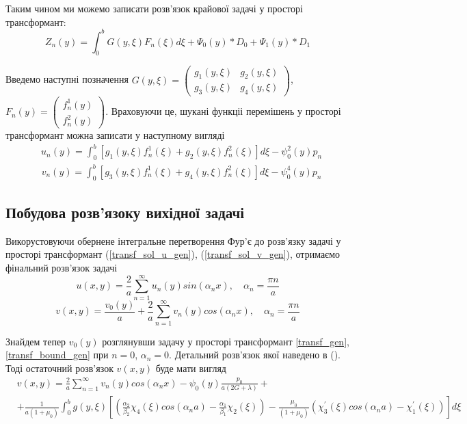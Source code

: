 Таким чином ми можемо записати розв'язок крайової задачі у просторі трансформант:
\begin{equation}
    Z_n(y) = \int_0^b G(y,\xi) F_n(\xi) d\xi + \Psi_0(y) * D_0 + \Psi_1(y) * D_1
\end{equation}

Введемо наступні позначення $G(y, \xi) = \begin{pmatrix}
    g_1(y,\xi) & g_2(y,\xi) \\
    g_3(y,\xi) & g_4(y,\xi)
\end{pmatrix}$, $F_n(y) = \begin{pmatrix}
    f_n^1(y) \\
    f_n^2(y)
\end{pmatrix}$. Враховуючи це, шукані функціі перемішень у просторі трансформант можна записати у наступному вигляді
\begin{align}\label{transf_sol_u_gen}
    &u_n(y) = \int_0^b \left[g_1(y, \xi)f_n^1(\xi) + g_2(y, \xi)f_n^2(\xi) \right]d\xi - \psi_0^2(y) p_n
\end{align}
\begin{align}\label{transf_sol_v_gen}
    &v_n(y) = \int_0^b \left[g_3(y, \xi)f_n^1(\xi) + g_4(y, \xi)f_n^2(\xi) \right]d\xi - \psi_0^4(y) p_n
\end{align}

\subsection{Побудова розв'язоку вихідної задачі}
Викорустовуючи обернене інтегральне перетворення Фур'є до розв'язку задачі у просторі трансформант
(\ref{transf_sol_u_gen}), (\ref{transf_sol_v_gen}), отримаємо фінальний розв'язок задачі
\begin{equation}
    u(x,y) = \frac{2}{a} \sum_{n=1}^{\infty} u_n(y) sin(\alpha_n x), \quad \alpha_n = \frac{\pi n}{a}
\end{equation}
\begin{equation}
    v(x,y) = \frac{v_0(y)}{a} + \frac{2}{a} \sum_{n=1}^{\infty} v_n(y) cos(\alpha_n x), \quad \alpha_n = \frac{\pi n}{a}
\end{equation}

Знайдем тепер $v_0(y)$ розглянувши задачу у просторі трансформант \eqref{transf_gen}, \eqref{transf_bound_gen} при $n=0$, $\alpha_n = 0$.
Детальний розв'язок якої наведено в (). Тоді остаточний розв'язок $v(x,y)$ буде мати вигляд
\begin{align}
    &v(x,y) = \frac{2}{a} \sum_{n=1}^{\infty} v_n(y) cos(\alpha_n x) - \psi_0(y) \frac{p_0}{a(2G + \lambda)} + \\
    &+ \frac{1}{a(1+\mu_0)} \int_{0}^{b}g(y,\xi) \left[ (\frac{\alpha_2}{\beta_2}\chi_4(\xi) cos(\alpha_n a) - \frac{\alpha_1}{\beta_1}\chi_2(\xi)) - \frac{\mu_0}{(1+\mu_0)} (\chi_3^{'}(\xi) cos(\alpha_n a) -\chi_1^{'}(\xi)) \right] d\xi
\end{align}

